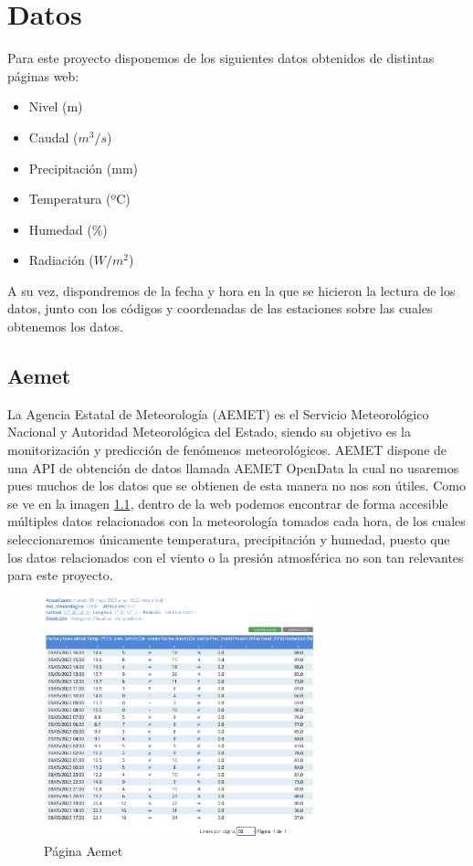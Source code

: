 \chapter[Datos]{Datos}
\label{Chap2}

Para este proyecto disponemos de los siguientes datos obtenidos de distintas páginas web:
\begin{itemize}
	\item Nivel (m)
	\item Caudal ($m^3/s$)
	\item Precipitación (mm)
	\item Temperatura (ºC)
	\item Humedad (\%)
	\item Radiación ($W/m^2$)
\end{itemize}
A su vez, dispondremos de la fecha y hora en la que se hicieron la lectura de los datos, junto con los códigos y coordenadas de las estaciones sobre las cuales obtenemos los datos.

\section{Aemet}
La Agencia Estatal de Meteorología (AEMET) es el Servicio Meteorológico Nacional y Autoridad Meteorológica del Estado, siendo su objetivo es la monitorización y predicción de fenómenos meteorológicos.
\newline
\newline
AEMET dispone de una API de obtención de datos llamada AEMET OpenData la cual no usaremos pues muchos de los datos que se obtienen de esta manera no nos son útiles.
\newline
\newline
Como se ve en la imagen \ref{fig:ej3}, dentro de la web podemos encontrar de forma accesible múltiples datos relacionados con la meteorología tomados cada hora, de los cuales seleccionaremos únicamente temperatura, precipitación y humedad, puesto que los datos relacionados con el viento o la presión atmosférica no son tan relevantes para este proyecto.

\begin{figure} [h!]
	\centering
	\includegraphics[width=0.7\textwidth]{fig/Aemet.png}
	\caption[Página Aemet de la estación en Aranguren (Navarra)]{Página Aemet}
	\label{fig:ej3}
\end{figure}

